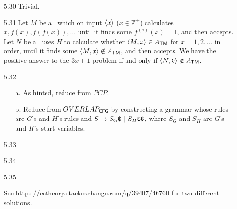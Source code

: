 \begin{itemize}
	\item[5.30]
	Trivial.
	
	\item[5.31]
	Let $M$ be a \TM\ which on input $\Bra{x}$ ($x \in \mathbb{Z}^+$) calculates $x, f(x), f(f(x)), \dots$ until it finds some $f^{(n)}(x)	= 1$, and then accepts. Let $N$ be a \TM\ uses $H$ to calculate whether $\Bra{M, x} \in A_{\TM}$ for $x = 1, 2, \dots$ in order, until it finds some $\Bra{M, x} \notin A_{\TM}$, and then accepts. We have the positive answer to the $3x + 1$ problem if and only if $\Bra{N, \TT{0}} \notin A_{\TM}$. 
	
	\item[5.32]
	\begin{itemize}
		\item[a.] As hinted, reduce from $PCP$.
		\item[b.] Reduce from $OVERLAP_{\CFG}$ by constructing a grammar whose rules are $G$'s and $H$'s rules and $S \to S_G \TT{\$} \ | \ S_H \TT{\$\$}$, where $S_G$ and $S_H$ are $G$'s and $H$'s start variables.
	\end{itemize}

	\item[5.33]
	\Empty
	
	\item[5.34]
	\Empty
	
	\item[5.35]
	\Empty
	
	\item[\Star 5.36]
	See \url{https://cstheory.stackexchange.com/q/39407/46760} for two different solutions.
	
\end{itemize}